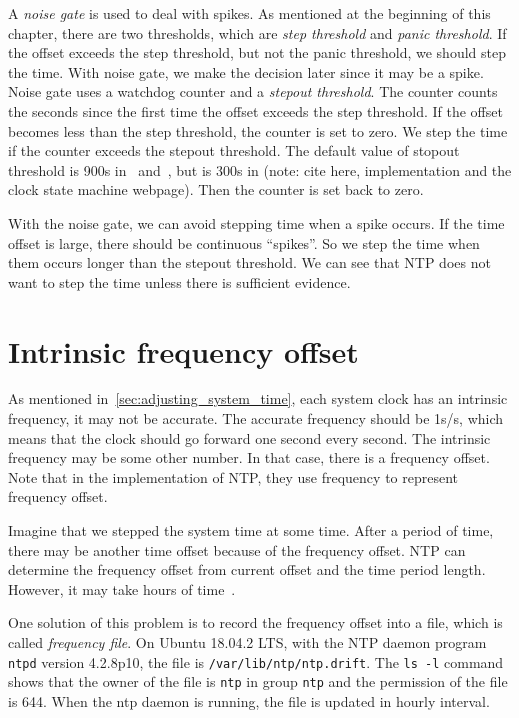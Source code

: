 A \emph{noise gate} is used to deal with spikes. As mentioned at the beginning 
of this chapter, there are two thresholds, which are \emph{step threshold} and 
\emph{panic threshold}. If the offset exceeds the step threshold, but not the
panic threshold, we should step the time. With noise gate, we make the decision
later since it may be a spike. Noise gate uses a watchdog counter and a
\emph{stepout threshold}. The counter counts the seconds since the first time
the offset exceeds the step threshold. If the offset becomes less than the step
threshold, the counter is set to zero. We step the time if the counter exceeds
the stepout threshold. The default value of stopout threshold is 900s
in~\cite{redbook} and~\cite{rfc5905}, but is 300s in (note: cite here,
implementation and the clock state machine webpage). Then the counter is set
back to zero.

With the noise gate, we can avoid stepping time when a spike occurs. If the
time offset is large, there should be continuous ``spikes''. So we step the
time when them occurs longer than the stepout threshold. We can see that NTP
does not want to step the time unless there is sufficient evidence.

\section{Intrinsic frequency offset}%
\label{sec:intrinsic_frequency_offset}
As mentioned in~\ref{sec:adjusting_system_time}, each system clock has an
intrinsic frequency, it may not be accurate. The accurate frequency should be
1s/s, which means that the clock should go forward one second every second. The
intrinsic frequency may be some other number. In that case, there is a
frequency offset. Note that in the implementation of NTP\null, they use
frequency to represent frequency offset. 

Imagine that we stepped the system time at some time. After a period of time,
there may be another time offset because of the frequency offset. NTP can
determine the frequency offset from current offset and the time period length.
However, it may take hours of time~\cite{redbook}. 

One solution of this problem is to record the frequency offset into a file,
which is called \emph{frequency file}. On Ubuntu 18.04.2 LTS, with the NTP
daemon program \verb|ntpd| version 4.2.8p10, the file is
\verb|/var/lib/ntp/ntp.drift|. The \verb|ls -l| command shows that the owner of
the file is \verb|ntp| in group \verb|ntp| and the permission of the file is
644. When the ntp daemon is running, the file is updated in hourly interval.


